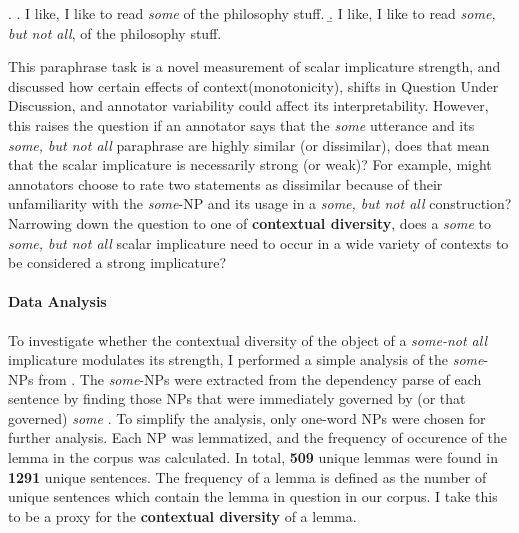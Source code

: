 \documentclass[10pt, biblatex, linguex]{report}
\begin{document}
\ex.\label{ex:paraphrase} \a. I like, I like to read \textit{some} of the philosophy stuff.
     \b. I like, I like to read \textit{some, but not all}, of the philosophy stuff.

This paraphrase task is a novel measurement of scalar implicature strength,
and \citeauthor{degen_investigating_2015} discussed how certain effects of
context(monotonicity), shifts in Question Under Discussion, and annotator
variability could affect its interpretability. However, this raises the question
\dash if an annotator
says that the \textit{some} utterance and its \textit{some, but not all}
paraphrase are highly similar (or dissimilar), does that mean that the scalar
implicature is necessarily strong (or weak)? For example, might annotators choose
to rate two statements as dissimilar because of their unfamiliarity with the
\textit{some}-NP and its usage in a \textit{some, but not all} construction?
Narrowing down the
question to one of \textbf{contextual diversity}, does a \textit{some} to
\textit{some, but not all} scalar implicature need to occur in a wide variety
of contexts to be considered a strong implicature?


\paragraph{Data Analysis} To investigate whether the contextual diversity of the
object of a \textit{some-not all} implicature modulates its strength, I performed
a simple analysis of the \textit{some}-NPs from \citet{degen_investigating_2015}.
The \textit{some}-NPs were extracted from the dependency parse of each sentence
\citep{qi2020stanza} by finding those NPs that were immediately governed by (or
that governed) \textit{some} \citep{white-EtAl:2016:EMNLP2016,
zhang-EtAl:2017:IWCS}. To simplify the analysis, only one-word NPs were chosen
for further analysis. Each NP was lemmatized, and the frequency of occurence of
the lemma in the corpus was calculated. In total, \textbf{509} unique lemmas
were found in \textbf{1291} unique sentences. The frequency of a lemma is defined
as the number of unique sentences which contain the lemma in question in our
corpus. I take this to be a proxy for the \textbf{contextual diversity} of a
lemma.
\end{document}
